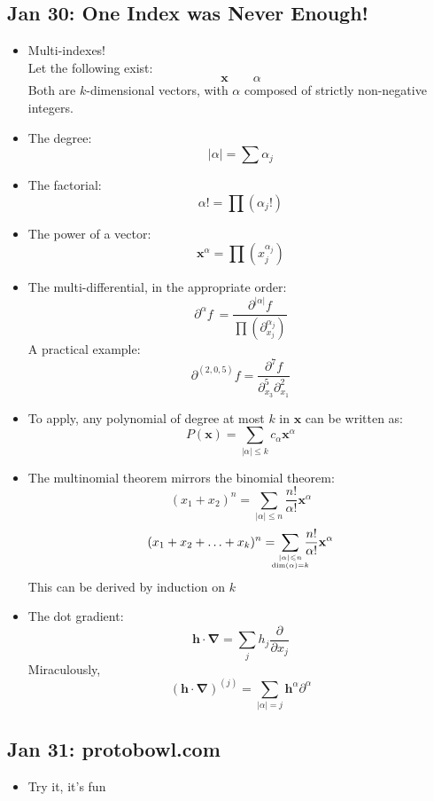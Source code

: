 \documentclass[10pt, oneside]{article}
\newcommand{\del}{\partial}
\newcommand{\stack}[2]{\genfrac{}{}{0pt}{}{#1}{#2}}
\let\leq\leqslant
\renewcommand{\vec}[1]{\mathbf{#1}}
\begin{document}
\subsection{Jan 30: One Index was Never Enough!}
\begin{itemize}
    \item Multi-indexes!\\
        Let the following exist:
        \[\vec{x} \quad \quad \alpha\]
        Both are $k$-dimensional vectors, with $\alpha$ composed of strictly non-negative integers.
    \item The degree:
        \[|\alpha| = \sum \alpha_j\]
    \item The factorial:
        \[\alpha! = \prod (\alpha_j!)\]
    \item The power of a vector:
        \[\vec{x}^\alpha = \prod(x_j^{\alpha_j})\]
    \item The multi-differential, in the appropriate order:
        \[\del^\alpha f\ = \frac{\del^{|\alpha|} f}{\prod (\del_{x_j}^{\alpha_j})}\]
        A practical example:
        \[\del^{(2,0,5)} f = \frac{\del^7 f}{\del_{x_3}^5 \del_{x_1}^2}\]
    \item To apply, any polynomial of degree at most $k$ in $\vec{x}$ can be written as:
        \[P(\vec{x}) = \sum_{|\alpha| \leq k} c_\alpha \vec{x}^\alpha\]
    \item The multinomial theorem mirrors the binomial theorem:
        \[(x_1 + x_2)^n = \sum_{|\alpha| \leq n} \frac{n!}{\alpha!} \vec{x}^\alpha\]
        \[(x_1 + x_2 + \hdots + x_k)^n = \! \! \! \! \sum_{\stack{|\alpha| \leq n}{\dim(\alpha) = k}} \! \! \! \! \frac{n!}{\alpha!} \vec{x}^\alpha\]
        This can be derived by induction on $k$
    \item The dot gradient:
        \[\vec{h} \cdot \vec{\nabla} = \sum_j h_j \frac{\del}{\del x_j}\]
        Miraculously,
        \[(\vec{h} \cdot \vec{\nabla})^{(j)} = \sum_{|\alpha| = j} \vec{h}^\alpha \del^\alpha\]
\end{itemize}

\subsection{Jan 31: protobowl.com}
\begin{itemize}
    \item Try it, it's fun
\end{itemize}
\end{document}
